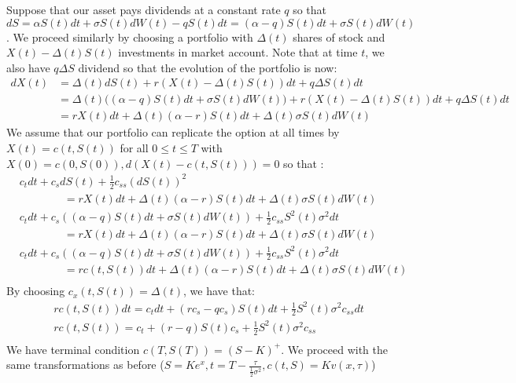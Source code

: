 \documentclass[12pt,twoside, letter]{exam}
\theoremstyle{definition}
\begin{document}
  \begin{solution}
    Suppose that our asset pays dividends at a constant rate $q$ so that $dS = \alpha S(t) dt + \sigma S(t) dW(t) - q S(t)dt
    = (\alpha - q)S(t) dt + \sigma S(t) dW(t)$. We proceed similarly by choosing a portfolio with $\Delta(t)$ shares of stock
    and $X(t) - \Delta(t)S(t)$ investments in market account. Note that at time $t$, we also have $q\Delta S$ dividend so that the evolution of the portfolio is now:
    \begin{align*}
      dX(t) &= \Delta(t)dS(t) + r(X(t) - \Delta(t)S(t))dt + q\Delta S(t)dt \\
      &= \Delta(t)\big((\alpha - q)S(t) dt + \sigma S(t) dW(t)\big) + r(X(t) - \Delta(t)S(t))dt + q\Delta S(t)dt \\
      &= rX(t)dt + \Delta(t)(\alpha - r)S(t)dt + \Delta(t)\sigma S(t)dW(t)
    \end{align*}
    We assume that our portfolio can replicate the option at all times by $X(t) = c(t,S(t))$ for all $0 \leq t \leq T$ with
    $X(0) = c(0,S(0)), d(X(t)-c(t,S(t))) = 0$ so that :
    \begin{align*}
      &c_t dt + c_s dS(t) + \frac{1}{2} c_{ss}(dS(t))^2 \\
      & \qquad \qquad = rX(t)dt + \Delta(t)(\alpha - r)S(t)dt + \Delta(t)\sigma S(t)dW(t)\\
      &c_t dt + c_s ((\alpha - q)S(t) dt + \sigma S(t) dW(t)) + \frac{1}{2}c_{ss} S^2(t)\sigma^2 dt \\
      & \qquad \qquad = rX(t)dt + \Delta(t)(\alpha - r)S(t)dt + \Delta(t)\sigma S(t)dW(t) \\
      &c_t dt + c_s ((\alpha - q)S(t) dt + \sigma S(t) dW(t)) + \frac{1}{2}c_{ss} S^2(t)\sigma^2 dt \\
      & \qquad \qquad = rc(t,S(t))dt + \Delta(t)(\alpha - r)S(t)dt + \Delta(t)\sigma S(t)dW(t)\\
    \end{align*}
    By choosing $c_x(t,S(t)) = \Delta(t)$, we have that:
    \begin{align*}
      &rc(t,S(t))dt = c_t dt + (r c_s - q c_s)S(t) dt + \frac{1}{2} S^2(t)\sigma^2 c_{ss} dt \\
      &rc(t,S(t)) = c_t + (r - q)S(t)c_s + \frac{1}{2} S^2(t)\sigma^2 c_{ss} \\
    \end{align*}
    We have terminal condition $c(T,S(T)) = (S - K)^+$. We proceed with the same transformations as before ($S = Ke^{x},t = T - \frac{\tau}{\frac{1}{2}\sigma^2}, c(t,S)=Kv(x,\tau)$)

\end{solution}
\end{document}
